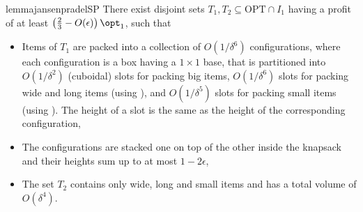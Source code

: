 \begin{restatable}{lemma}{jansenpradelSP}
\label{lem:jansenpradelSP}
    There exist disjoint sets $T_1,T_2\subseteq \text{OPT}\cap I_1$ having a profit of at least $\left(\frac{2}{3}-O(\epsilon)\right)\opt_1$, such that
    \begin{itemize}
        \item Items of $T_1$ are packed into a collection of $O(1/\delta^6)$ configurations, where each configuration is a box having a $1\times 1$ base, that is partitioned 
    into  $O(1/\delta^2)$ (cuboidal) slots for packing big items, $O(1/\delta^6)$ slots for packing wide and long items (using \NFDH), and $O(1/\delta^5)$ slots for packing small items (using \tNFDH). The height of a slot is the same as the height of the corresponding configuration,
        \item The configurations are stacked one on top of the other inside the knapsack and their heights sum up to at most $1-2\epsilon$,
        \item The set $T_2$ contains only wide, long and small items and has a total volume of $O(\delta^4)$. %
    \end{itemize}
\end{restatable}
